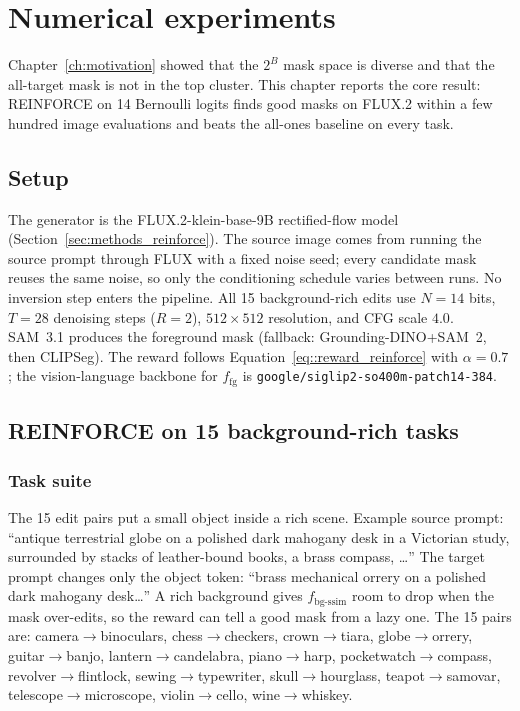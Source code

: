 \chapter{Numerical experiments}
\label{ch:experiments}

Chapter~\ref{ch:motivation} showed that the $2^{B}$ mask space is diverse and that the all-target mask is not in the top cluster. This chapter reports the core result: REINFORCE on 14 Bernoulli logits finds good masks on FLUX.2 within a few hundred image evaluations and beats the all-ones baseline on every task.

\section{Setup}
\label{sec:experiments_seg}

The generator is the FLUX.2-klein-base-9B rectified-flow model (Section~\ref{sec:methods_reinforce}). The source image comes from running the source prompt through FLUX with a fixed noise seed; every candidate mask reuses the same noise, so only the conditioning schedule varies between runs. No inversion step enters the pipeline. All 15 background-rich edits use $N=14$ bits, $T=28$ denoising steps ($R=2$), $512{\times}512$ resolution, and CFG scale $4.0$. SAM~3.1 produces the foreground mask (fallback: Grounding-DINO+SAM~2, then CLIPSeg). The reward follows Equation~\ref{eq::reward_reinforce} with $\alpha=0.7$; the vision-language backbone for $f_{\text{fg}}$ is \texttt{google/siglip2-so400m-patch14-384}.

\section{REINFORCE on 15 background-rich tasks}
\label{sec:experiments_new_bgrich}

\subsection{Task suite}

The 15 edit pairs put a small object inside a rich scene. Example source prompt: ``antique terrestrial globe on a polished dark mahogany desk in a Victorian study, surrounded by stacks of leather-bound books, a brass compass, \dots'' The target prompt changes only the object token: ``brass mechanical orrery on a polished dark mahogany desk\dots'' A rich background gives $f_{\text{bg-ssim}}$ room to drop when the mask over-edits, so the reward can tell a good mask from a lazy one. The 15 pairs are: camera$\to$binoculars, chess$\to$checkers, crown$\to$tiara, globe$\to$orrery, guitar$\to$banjo, lantern$\to$candelabra, piano$\to$harp, pocketwatch$\to$compass, revolver$\to$flintlock, sewing$\to$typewriter, skull$\to$hourglass, teapot$\to$samovar, telescope$\to$microscope, violin$\to$cello, wine$\to$whiskey.

